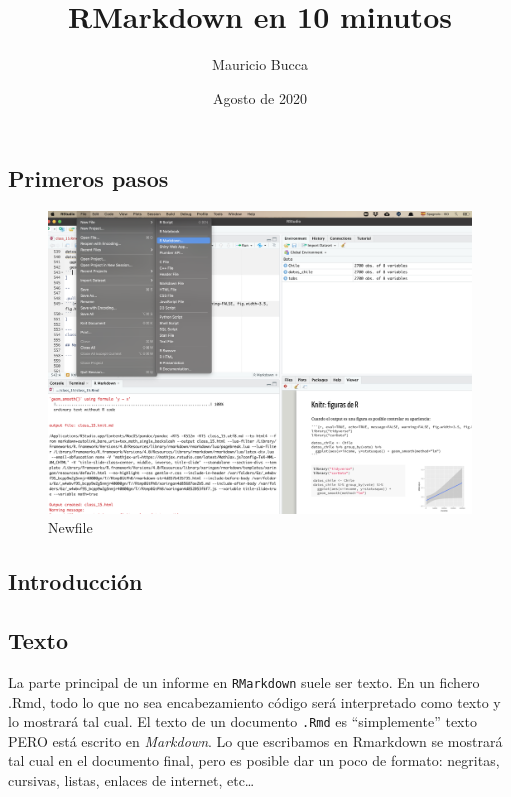\documentclass[
]{article}
\title{RMarkdown en 10 minutos}
\author{Mauricio Bucca}
\date{Agosto de 2020}
\begin{document}
\maketitle

\hypertarget{primeros-pasos}{%
\subsection{Primeros pasos}\label{primeros-pasos}}

\begin{figure}
\centering
\includegraphics{images/inicio.png}
\caption{Newfile}
\end{figure}

\hypertarget{introducciuxf3n}{%
\subsection{Introducción}\label{introducciuxf3n}}

\hypertarget{texto}{%
\subsection{Texto}\label{texto}}

La parte principal de un informe en \texttt{RMarkdown} suele ser texto.
En un fichero .Rmd, todo lo que no sea encabezamiento código será
interpretado como texto y lo mostrará tal cual. El texto de un documento
\texttt{.Rmd} es ``simplemente'' texto PERO está escrito en
\emph{Markdown}. Lo que escribamos en Rmarkdown se mostrará tal cual en
el documento final, pero es posible dar un poco de formato: negritas,
cursivas, listas, enlaces de internet, etc\ldots{}
\end{document}
